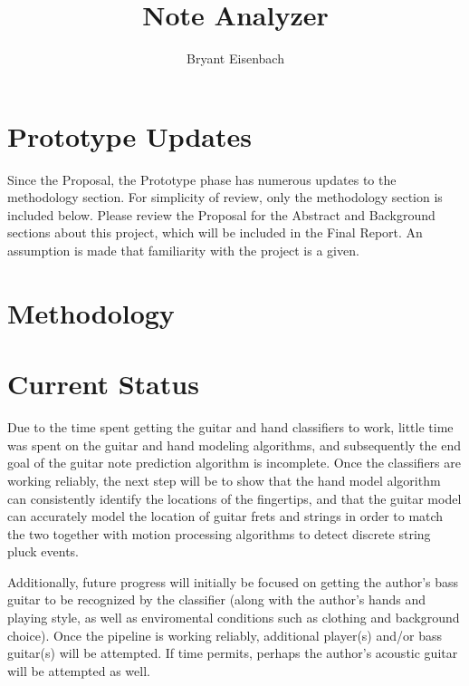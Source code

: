 \documentclass[titlepage]{article}
\author{Bryant Eisenbach}
\title{Note Analyzer}
\begin{document}
%

\section{Prototype Updates}
Since the Proposal, the Prototype phase has numerous updates to the methodology section.
For simplicity of review, only the methodology section is included below.
Please review the Proposal for the Abstract and Background sections about this project,
which will be included in the Final Report.
An assumption is made that familiarity with the project is a given.

\section{Methodology}


\section{Current Status}
Due to the time spent getting the guitar and hand classifiers to work,
little time was spent on the guitar and hand modeling algorithms,
and subsequently the end goal of the guitar note prediction algorithm is incomplete.
Once the classifiers are working reliably, the next step will be to show that
the hand model algorithm can consistently identify the locations of the fingertips,
and that the guitar model can accurately model the location of guitar frets and strings
in order to match the two together with motion processing algorithms to detect discrete
string pluck events.

Additionally, future progress will initially be focused on getting the
author's bass guitar to be recognized by the classifier
(along with the author's hands and playing style, as well as enviromental conditions such as clothing and background choice).
Once the pipeline is working reliably, additional player(s) and/or bass guitar(s) will
be attempted. If time permits, perhaps the author's acoustic guitar will be attempted as well.

\pagebreak
{}

\end{document}
